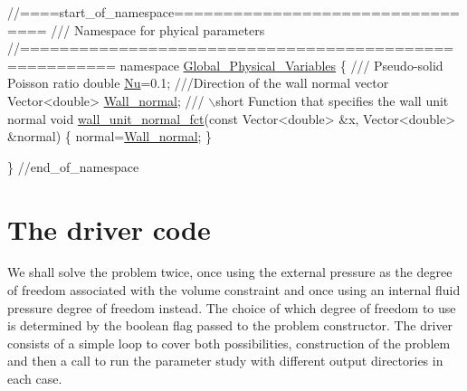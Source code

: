  
\begin{DoxyCodeInclude}
\textcolor{comment}{//====start\_of\_namespace=================================}
\textcolor{comment}{/// Namespace for phyical parameters}
\textcolor{comment}{}\textcolor{comment}{//=======================================================}
\textcolor{keyword}{namespace }\hyperlink{namespaceGlobal__Physical__Variables}{Global\_Physical\_Variables}
\{
\textcolor{comment}{}
\textcolor{comment}{ /// Pseudo-solid Poisson ratio}
\textcolor{comment}{} \textcolor{keywordtype}{double} \hyperlink{namespaceGlobal__Physical__Variables_a3962c36313826b19f216f6bbbdd6a477}{Nu}=0.1;
\textcolor{comment}{}
\textcolor{comment}{ ///Direction of the wall normal vector}
\textcolor{comment}{} Vector<double> \hyperlink{namespaceGlobal__Physical__Variables_af3a3b98f9f5b354d01228884e49c5bf0}{Wall\_normal};
\textcolor{comment}{}
\textcolor{comment}{ /// \(\backslash\)short Function that specifies the wall unit normal}
\textcolor{comment}{} \textcolor{keywordtype}{void} \hyperlink{namespaceGlobal__Physical__Variables_a0d48e8726fa485de2b2df2d5031ec41b}{wall\_unit\_normal\_fct}(\textcolor{keyword}{const} Vector<double> &x, 
                      Vector<double> &normal)
 \{
  normal=\hyperlink{namespaceGlobal__Physical__Variables_af3a3b98f9f5b354d01228884e49c5bf0}{Wall\_normal};
 \}

\} \textcolor{comment}{//end\_of\_namespace}

\end{DoxyCodeInclude}
\hypertarget{index_driver}{}\section{The driver code}\label{index_driver}
We shall solve the problem twice, once using the external pressure as the degree of freedom associated with the volume constraint and once using an internal fluid pressure degree of freedom instead. The choice of which degree of freedom to use is determined by the boolean flag passed to the problem constructor. The driver consists of a simple loop to cover both possibilities, construction of the problem and then a call to run the parameter study with different output directories in each case.


